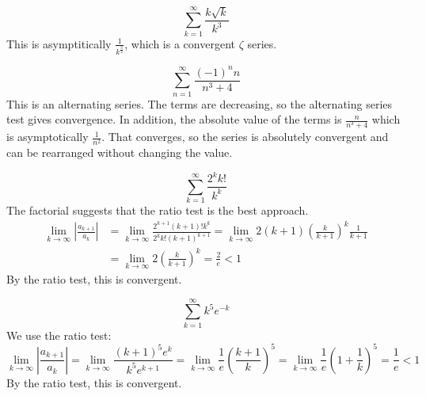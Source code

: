 \documentclass[fleqn,letterpaper]{report}
\begin{document}
\begin{example}
\begin{equation*}
\sum_{k=1}^\infty \frac{k\sqrt{k}}{k^3}
\end{equation*}
This is asymptitically $\frac{1}{k^{\frac{3}{2}}}$, which is a
convergent $\zeta$ series.
\end{example}

\begin{example}
\begin{equation*}
\sum_{n=1}^\infty \frac{(-1)^n n}{n^3+4}
\end{equation*}
This is an alternating series. The terms are decreasing, so the
alternating series test gives convergence.
In addition, the absolute value of the terms is $\frac{n}{n^3+4}$
which is asymptotically $\frac{1}{n^2}$. That converges, so the
series is absolutely convergent and can be rearranged without
changing the value.
\end{example}

\begin{example}
\begin{equation*}
\sum_{k=1}^\infty \frac{2^k k!}{k^k}
\end{equation*}
The factorial suggests that the ratio test is the best
approach.
\begin{align*}
\lim_{k \rightarrow \infty} \left| \frac{a_{k+1}}{a_k} \right|
& = \lim_{k \rightarrow \infty} \frac{2^{k+1} (k+1)! k^k}{2^k
k! (k+1)^{k+1}} 
= \lim_{k \rightarrow \infty} 2 (k+1) \left( \frac{k}{k+1} \right)^k
\frac{1}{k+1} \\
& = \lim_{k \rightarrow \infty} 2 \left( \frac{k}{k+1}
\right)^k = \frac{2}{e} < 1 
\end{align*}
By the ratio test, this is convergent.
\end{example}

\begin{example}
\begin{equation*}
\sum_{k=1}^\infty k^5 e^{-k}
\end{equation*}
We use the ratio test:
\begin{equation*}
\lim_{k \rightarrow \infty} \left| \frac{a_{k+1}}{a_k} \right|
= \lim_{k \rightarrow \infty} \frac{(k+1)^5 e^k}{k^5
e^{k+1}} 
= \lim_{k \rightarrow \infty} \frac{1}{e} \left(
\frac{k+1}{k} \right)^5 
= \lim_{k \rightarrow \infty} \frac{1}{e} \left( 1 +
\frac{1}{k} \right)^5 = \frac{1}{e} < 1
\end{equation*}
By the ratio test, this is convergent.
\end{example}
\end{document}
